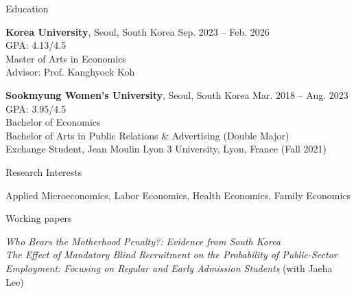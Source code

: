 \documentclass{resume} %
\begin{document}

\begin{rSection}{Education}

{\bf Korea University}, Seoul, South Korea \hfill Sep. 2023 -- Feb. 2026
\\
GPA: 4.13/4.5
\\
Master of Arts in Economics
\\
Advisor: Prof. Kanghyock Koh

{\bf Sookmyung Women's University}, Seoul, South Korea \hfill Mar. 2018 -- Aug. 2023
\\
GPA: 3.95/4.5
\\
Bachelor of Economics
\\
Bachelor of Arts in Public Relations \& Advertising (Double Major)
\\
Exchange Student, Jean Moulin Lyon 3 University, Lyon, France (Fall 2021)

\end{rSection}


\begin{rSection}{Research Interests}

Applied Microeconomics, Labor Economics, Health Economics, Family Economics

\end{rSection}


\begin{rSection}{Working papers}

\textit{Who Bears the Motherhood Penalty?: Evidence from South Korea} \\
\textit{The Effect of Mandatory Blind Recruitment on the Probability of Public-Sector Employment: Focusing on Regular and Early Admission Students} (with Jaeha Lee)

\end{rSection}

\end{document}

